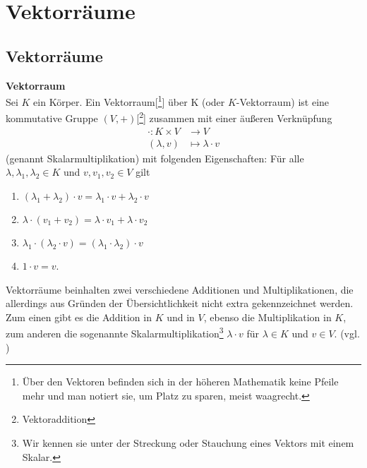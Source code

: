 \chapter{Vektorräume}
\label{sec:VR}

\section{Vektorräume}
\label{sec:Vektorräume}
\theoremstyle{definition}
\begin{definition}{\textbf{Vektorraum}}
\label{VR-axiome}
\\{\glqq}Sei $K$ ein Körper. Ein Vektorraum[\footnote{Über den Vektoren befinden sich in der höheren Mathematik keine Pfeile mehr und man notiert sie, um Platz zu sparen, meist waagrecht.}] über K (oder $K$-Vektorraum) ist eine kommutative Gruppe $(V,+)$[\footnote{Vektoraddition}] zusammen mit einer äußeren Verknüpfung 
	\begin{align*}
	\cdot : K \times V &\rightarrow V
	\\ (\lambda,v) &\mapsto \lambda \cdot v
	\end{align*}
(genannt Skalarmultiplikation) mit folgenden Eigenschaften: Für alle $\lambda, \lambda_1, \lambda_2 \in K$ und $v, v_1, v_2 \in V$ gilt
	\begin{enumerate}
		\item $(\lambda_1 + \lambda_2) \cdot v = \lambda_1 \cdot v + 	\lambda_2 \cdot v $
		\item $ \lambda \cdot (v_1 + v_2) = \lambda \cdot v_1 + \lambda \cdot v_2$
		\item $\lambda_1 \cdot (\lambda_2 \cdot v) = (\lambda_1 \cdot \lambda_2) \cdot v$
		\item $ 1 \cdot v = v$.{\grqq} \cite[S. 28, 6.1]{Skript}
	\end{enumerate}
\end{definition}

\theoremstyle{bem}
\begin{bem}{}
Vektorräume beinhalten zwei verschiedene Additionen und Multiplikationen, die allerdings aus Gründen der Übersichtlichkeit nicht extra gekennzeichnet werden. Zum einen gibt es die Addition in $K$ und in $V$, ebenso die Multiplikation in $K$, zum anderen die sogenannte Skalarmultiplikation\footnote{Wir kennen sie unter der Streckung oder Stauchung eines Vektors mit einem Skalar.} \(\lambda \cdot v \) für $\lambda \in K$ und $v \in V$. (vgl. \cite[S. 28, 6.1]{Skript})
\end{bem}

